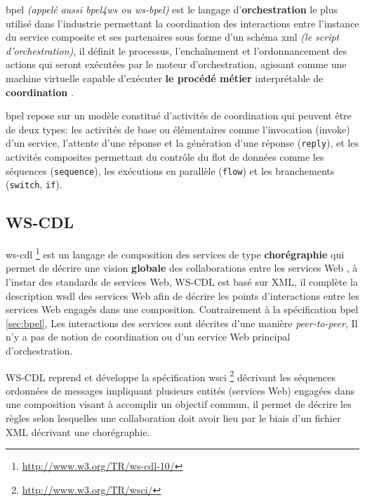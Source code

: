   \acrshort{bpel} \textit{(appelé aussi \acrshort{bpel4ws} ou
    \acrshort{ws-bpel})} est le langage d'\textbf{orchestration} le
  plus utilisé dans l'industrie permettant la coordination des
  interactions entre l'instance du service composite et ses
  partenaires sous forme d'un schéma \acrshort{xml} \textit{(le script
    d'orchestration)}, il définit le processus, l'enchaînement et
  l'ordonnancement des actions qui seront exécutées par le moteur
  d'orchestration, agissant comme une machine virtuelle capable
  d'exécuter \textbf{le procédé métier} interprétable de
  \textbf{coordination} \cite{chollet2009orchestration}.\medskip

  \acrshort{bpel} repose sur un modèle constitué d'activités de
  coordination qui peuvent être de deux types: les activités de base
  ou élémentaires comme l'invocation (invoke) d'un service, l'attente
  d'une réponse et la génération d'une réponse (\verb|reply|), et les
  activités composites permettant du contrôle du flot de données comme
  les séquences (\verb|sequence|), les exécutions en parallèle
  (\verb|flow|) et les branchements (\verb|switch|, \verb|if|).

  \subsection{WS-CDL}
  \label{sec:WS-CDL}
  \acrshort{ws-cdl} \footnote{\url{http://www.w3.org/TR/ws-cdl-10/}}
  \cite{kavantzas2005web} est un langage de composition des services de
  type \textbf{chorégraphie} qui permet de décrire une vision
  \textbf{globale} des collaborations entre les services Web
  \cite{elie2010}, à l'instar des standards de services Web,
  \textsc{WS-CDL} est basé sur \textsc{XML}, il complète la
  description \acrshort{wsdl} des services Web afin de décrire les
  points d'interactions entre les services Web engagés dans une
  composition. Contrairement à la spécification \acrshort{bpel}
  \ref{sec:bpel}, Les interactions des services sont décrites d'une
  manière \textit{peer-to-peer}, Il n'y a pas de notion de
  coordination ou d'un service Web principal d'orchestration.\medskip

  \textsc{WS-CDL} reprend et développe la spécification
  \acrshort{wsci} \footnote{\url{http://www.w3.org/TR/wsci/}}
  \cite{arkin2002web} décrivant les séquences ordonnées de messages
  impliquant plusieurs entités (services Web) engagées dans une
  composition visant à accomplir un objectif commun, il permet de
  décrire les règles selon lesquelles une collaboration doit avoir
  lieu par le biais d'un fichier \textsc{XML} décrivant une
  chorégraphie.

